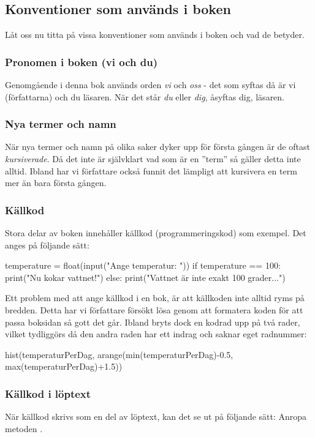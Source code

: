 \subsection{Konventioner som används i boken}
Låt oss nu titta på vissa konventioner som används i boken och vad de betyder.

\subsubsection{Pronomen i boken (vi och du)}
Genomgående i denna bok används orden \emph{vi} och \emph{oss} - det som syftas då är vi (författarna) och du läsaren. När det står \emph{du} eller \emph{dig}, åsyftas dig, läsaren.

\subsubsection{Nya termer och namn}
När nya termer och namn på olika saker dyker upp för första gången är de oftast \emph{kursiverade}. Då det inte är självklart vad som är en ''term'' så gäller detta inte alltid. Ibland har vi författare också funnit det lämpligt att kursivera en term mer än bara första gången.

\subsubsection{Källkod}
Stora delar av boken innehåller källkod (programmeringskod) som exempel. Det anges på följande sätt:

\begin{python}[caption={Exempel på källkod},label={}]
temperature = float(input("Ange temperatur: "))
if temperature == 100:
    print("Nu kokar vattnet!")
else:
    print("Vattnet är inte exakt 100 grader...")
\end{python}

Ett problem med att ange källkod i en bok, är att källkoden inte alltid ryms på bredden. Detta har vi författare försökt lösa genom att formatera koden för att passa boksidan så gott det går. Ibland bryts dock en kodrad upp på två rader, vilket tydliggörs då den andra raden har ett indrag och saknar eget radnummer:


\begin{python}
hist(temperaturPerDag, arange(min(temperaturPerDag)-0.5, max(temperaturPerDag)+1.5))
\end{python}

\subsubsection{Källkod i löptext}
När källkod skrivs som en del av löptext, kan det se ut på följande sätt: Anropa metoden .

